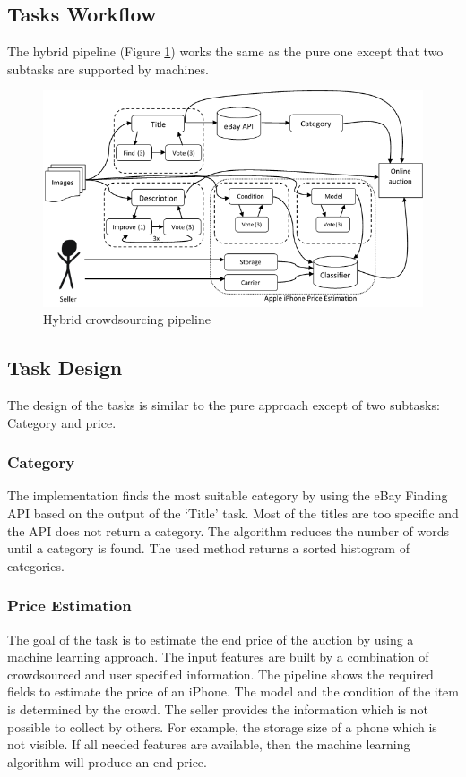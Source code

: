 \subsection{Tasks Workflow}
The hybrid pipeline (Figure \ref{hybridPipeline}) works the same as the pure one except that two subtasks are supported by machines.
\begin{figure}[h!]
\centering
\includegraphics[scale=0.8]{images/pipelines/Hybrid_Pipeline.png}
\caption{Hybrid crowdsourcing pipeline}
\label{hybridPipeline}
\end{figure}
\subsection{Task Design}
The design of the tasks is similar to the pure approach except of two subtasks: Category and price.
\subsubsection{Category}
The implementation finds the most suitable category by using the eBay Finding API based on the output of the `Title' task. Most of the titles are too specific and the API does not return a category. The algorithm reduces the number of words until a category is found. The used method returns a sorted histogram of categories.
\subsubsection{Price Estimation}
The goal of the task is to estimate the end price of the auction by using a machine learning approach. The input features are built by a combination of crowdsourced and user specified information. The pipeline shows the required fields to estimate the price of an iPhone. The model and the condition of the item is determined by the crowd. The seller provides the information which is not possible to collect by others. For example, the storage size of a phone which is not visible. If all needed features are available, then the machine learning algorithm will produce an end price.
